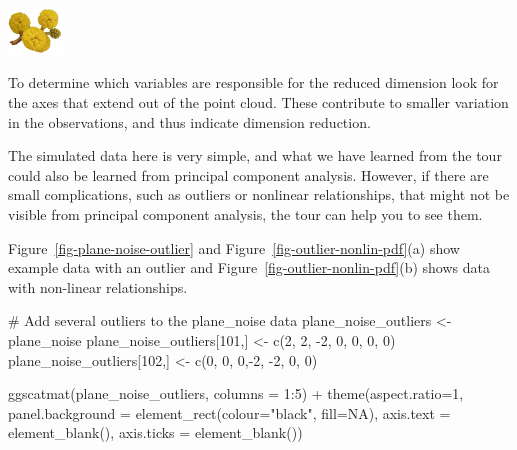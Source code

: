 \documentclass[
  letterpaper,
]{krantz}
\newenvironment{Shaded}{\begin{snugshade}}{\end{snugshade}}
\newcommand{\AttributeTok}[1]{\textcolor[rgb]{0.40,0.45,0.13}{#1}}
\newcommand{\CommentTok}[1]{\textcolor[rgb]{0.37,0.37,0.37}{#1}}
\newcommand{\ConstantTok}[1]{\textcolor[rgb]{0.56,0.35,0.01}{#1}}
\newcommand{\DecValTok}[1]{\textcolor[rgb]{0.68,0.00,0.00}{#1}}
\newcommand{\FunctionTok}[1]{\textcolor[rgb]{0.28,0.35,0.67}{#1}}
\newcommand{\NormalTok}[1]{\textcolor[rgb]{0.00,0.23,0.31}{#1}}
\newcommand{\OtherTok}[1]{\textcolor[rgb]{0.00,0.23,0.31}{#1}}
\newcommand{\SpecialCharTok}[1]{\textcolor[rgb]{0.37,0.37,0.37}{#1}}
\newcommand{\StringTok}[1]{\textcolor[rgb]{0.13,0.47,0.30}{#1}}
\newcommand{\infobox}[1]{%
\noindent\colorbox{info!30}{%
\begin{minipage}{0.98\linewidth}%
    \centering%
    \begin{minipage}[c]{0.15\linewidth} %
      \includegraphics[width=1.5cm]{images/mulga-flowers2.png} %
    \end{minipage}%
    \hfill %
    \begin{minipage}[c]{0.8\linewidth} %
      \bigskip%
      \textsf{#1}%
      \bigskip%
    \end{minipage}%
    \hspace*{3mm}%
  \end{minipage}%
}%
}
\begin{document}
\infobox{To determine which variables are responsible for the reduced dimension look for the axes that extend out of the point cloud. These contribute to smaller variation in the observations, and thus indicate dimension reduction.}

The simulated data here is very simple, and what we have learned from
the tour could also be learned from principal component analysis.
However, if there are small complications, such as outliers or nonlinear
relationships, that might not be visible from principal component
analysis, the tour can help you to see them.

Figure~\ref{fig-plane-noise-outlier} and
Figure~\ref{fig-outlier-nonlin-pdf}(a) show example data with an outlier
and Figure~\ref{fig-outlier-nonlin-pdf}(b) shows data with non-linear
relationships.

\begin{Shaded}
\begin{Highlighting}[]
\CommentTok{\# Add several outliers to the plane\_noise data}
\NormalTok{plane\_noise\_outliers }\OtherTok{\textless{}{-}}\NormalTok{ plane\_noise}
\NormalTok{plane\_noise\_outliers[}\DecValTok{101}\NormalTok{,] }\OtherTok{\textless{}{-}} \FunctionTok{c}\NormalTok{(}\DecValTok{2}\NormalTok{, }\DecValTok{2}\NormalTok{, }\SpecialCharTok{{-}}\DecValTok{2}\NormalTok{, }\DecValTok{0}\NormalTok{, }\DecValTok{0}\NormalTok{, }\DecValTok{0}\NormalTok{, }\DecValTok{0}\NormalTok{)}
\NormalTok{plane\_noise\_outliers[}\DecValTok{102}\NormalTok{,] }\OtherTok{\textless{}{-}} \FunctionTok{c}\NormalTok{(}\DecValTok{0}\NormalTok{, }\DecValTok{0}\NormalTok{, }\DecValTok{0}\NormalTok{,}\SpecialCharTok{{-}}\DecValTok{2}\NormalTok{, }\SpecialCharTok{{-}}\DecValTok{2}\NormalTok{, }\DecValTok{0}\NormalTok{, }\DecValTok{0}\NormalTok{)}

\FunctionTok{ggscatmat}\NormalTok{(plane\_noise\_outliers, }\AttributeTok{columns =} \DecValTok{1}\SpecialCharTok{:}\DecValTok{5}\NormalTok{) }\SpecialCharTok{+}
  \FunctionTok{theme}\NormalTok{(}\AttributeTok{aspect.ratio=}\DecValTok{1}\NormalTok{,}
    \AttributeTok{panel.background =} 
          \FunctionTok{element\_rect}\NormalTok{(}\AttributeTok{colour=}\StringTok{"black"}\NormalTok{, }\AttributeTok{fill=}\ConstantTok{NA}\NormalTok{),}
    \AttributeTok{axis.text =} \FunctionTok{element\_blank}\NormalTok{(),}
    \AttributeTok{axis.ticks =} \FunctionTok{element\_blank}\NormalTok{())}
\end{Highlighting}
\end{Shaded}
\end{document}

